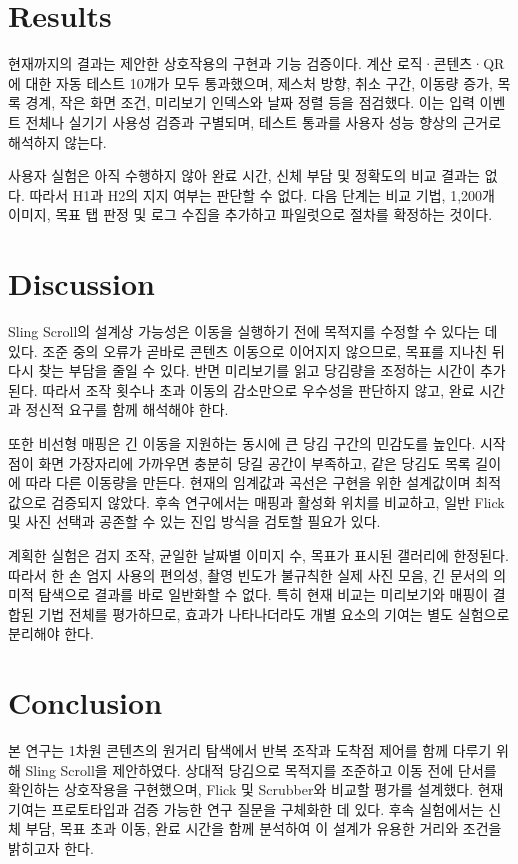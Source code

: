 \documentclass[manuscript,review,nonacm]{acmart}
\begin{document}
\section{Results}

현재까지의 결과는 제안한 상호작용의 구현과 기능 검증이다. 계산 로직·콘텐츠·QR에 대한 자동 테스트 10개가 모두 통과했으며, 제스처 방향, 취소 구간, 이동량 증가, 목록 경계, 작은 화면 조건, 미리보기 인덱스와 날짜 정렬 등을 점검했다. 이는 입력 이벤트 전체나 실기기 사용성 검증과 구별되며, 테스트 통과를 사용자 성능 향상의 근거로 해석하지 않는다.

사용자 실험은 아직 수행하지 않아 완료 시간, 신체 부담 및 정확도의 비교 결과는 없다. 따라서 H1과 H2의 지지 여부는 판단할 수 없다. 다음 단계는 비교 기법, 1,200개 이미지, 목표 탭 판정 및 로그 수집을 추가하고 파일럿으로 절차를 확정하는 것이다.

\section{Discussion}

Sling Scroll의 설계상 가능성은 이동을 실행하기 전에 목적지를 수정할 수 있다는 데 있다. 조준 중의 오류가 곧바로 콘텐츠 이동으로 이어지지 않으므로, 목표를 지나친 뒤 다시 찾는 부담을 줄일 수 있다. 반면 미리보기를 읽고 당김량을 조정하는 시간이 추가된다. 따라서 조작 횟수나 초과 이동의 감소만으로 우수성을 판단하지 않고, 완료 시간과 정신적 요구를 함께 해석해야 한다.

또한 비선형 매핑은 긴 이동을 지원하는 동시에 큰 당김 구간의 민감도를 높인다. 시작점이 화면 가장자리에 가까우면 충분히 당길 공간이 부족하고, 같은 당김도 목록 길이에 따라 다른 이동량을 만든다. 현재의 임계값과 곡선은 구현을 위한 설계값이며 최적값으로 검증되지 않았다. 후속 연구에서는 매핑과 활성화 위치를 비교하고, 일반 Flick 및 사진 선택과 공존할 수 있는 진입 방식을 검토할 필요가 있다.

계획한 실험은 검지 조작, 균일한 날짜별 이미지 수, 목표가 표시된 갤러리에 한정된다. 따라서 한 손 엄지 사용의 편의성, 촬영 빈도가 불규칙한 실제 사진 모음, 긴 문서의 의미적 탐색으로 결과를 바로 일반화할 수 없다. 특히 현재 비교는 미리보기와 매핑이 결합된 기법 전체를 평가하므로, 효과가 나타나더라도 개별 요소의 기여는 별도 실험으로 분리해야 한다.

\section{Conclusion}

본 연구는 1차원 콘텐츠의 원거리 탐색에서 반복 조작과 도착점 제어를 함께 다루기 위해 Sling Scroll을 제안하였다. 상대적 당김으로 목적지를 조준하고 이동 전에 단서를 확인하는 상호작용을 구현했으며, Flick 및 Scrubber와 비교할 평가를 설계했다. 현재 기여는 프로토타입과 검증 가능한 연구 질문을 구체화한 데 있다. 후속 실험에서는 신체 부담, 목표 초과 이동, 완료 시간을 함께 분석하여 이 설계가 유용한 거리와 조건을 밝히고자 한다.



\end{document}
